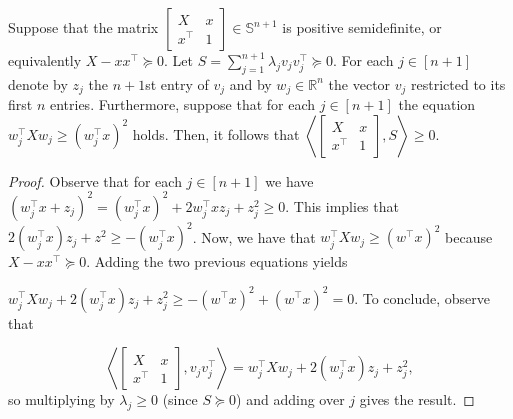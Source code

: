 \documentclass[10pt,a4paper]{amsart}
\begin{document}
\begin{lemma}\label{lem_soc_valid}
Suppose that the matrix $\begin{bmatrix}
X & x \\
x^\top & 1 
\end{bmatrix} \in \mathbb{S}^{n+1} $ is positive semidefinite, or equivalently $X-xx^\top \succeq 0$. Let $S = \sum_{j=1}^{n+1} \lambda_j v_jv_j^\top \succeq 0$. For each $j \in [n+1]$ denote by $z_j$ the $n+1$st entry of $v_j$ and by $w_j \in \mathbb{R}^n$ the vector $v_j$ restricted to its first $n$ entries. Furthermore, suppose that for each $j \in [n+1]$ the equation $
w_j^\top X w_j \geq (w_j^\top x)^2$
holds. Then, it follows that $
\left \langle  \begin{bmatrix}
X & x \\
x^\top & 1 
\end{bmatrix} , S \right \rangle \geq 0.$

\end{lemma}

\begin{proof}

Observe that for each $j \in [n+1]$ we have $
(w_j^\top x + z_j)^2 = (w_j^\top x )^2 + 2w_j^\top x z_j + z_j^2 \geq 0.$
This implies that $2(w_j^\top x)z_j + z^2 \geq -(w_j^\top x)^2$.
Now, we have that $w_j^\top X w_j \geq (w^\top x)^2$ because $X-xx^\top \succeq 0$. Adding the two previous equations yields

$
w_j^\top X w_j + 2(w_j^\top x)z_j + z_j^2 \geq  -(w^\top x)^2 + (w^\top x)^2 = 0.
$
To conclude, observe that

\[
\left \langle  \begin{bmatrix}
X & x \\
x^\top & 1 
\end{bmatrix}   , v_jv_j^\top  \right \rangle = w_j^\top X w_j + 2(w_j^\top x)z_j + z_j^2,
\]
so multiplying by $\lambda_j \geq 0$ (since $S\succeq 0$) and adding over $j$ gives the result.


\end{proof}
\end{document}
